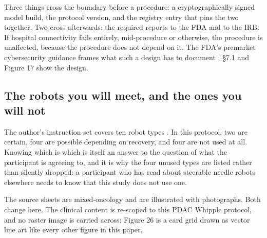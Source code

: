 Three things cross the boundary before a procedure: a cryptographically signed
model build, the protocol version, and the registry entry that pins the two
together. Two cross afterwards: the required reports to the FDA and to the IRB.
If hospital connectivity fails entirely, mid-procedure or otherwise, the
procedure is unaffected, because the procedure does not depend on it. The FDA's
premarket cybersecurity guidance frames what such a design has to document
\cite{FDACyber2026}; \S 7.1 and Figure 17 show the design.

\subsection{The robots you will meet, and the ones you will not}

The author's instruction set covers ten robot types \cite{patrobotinst}. In this
protocol, two are certain, four are possible depending on recovery, and four are
not used at all. Knowing which is which is itself an answer to the question of
what the participant is agreeing to, and it is why the four unused types are
listed rather than silently dropped: a participant who has read about steerable
needle robots elsewhere needs to know that this study does not use one.

The source sheets are mixed-oncology and are illustrated with photographs. Both
change here. The clinical content is re-scoped to this PDAC Whipple protocol,
and no raster image is carried across: Figure 26 is a card grid drawn as vector
line art like every other figure in this paper.

